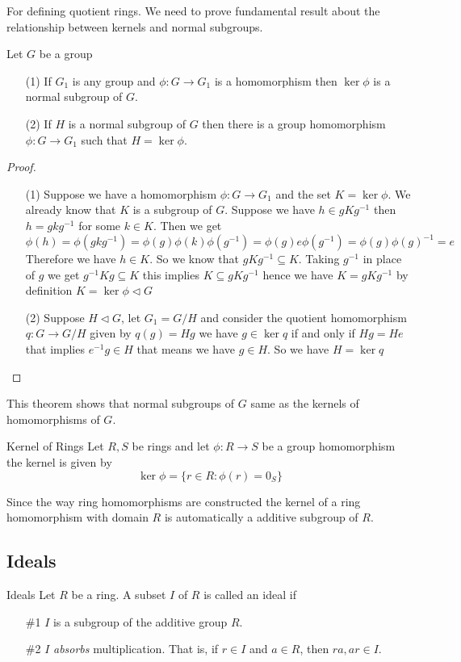 \documentclass[16pt,a4paper]{article}
\theoremstyle{definition}
\begin{document}
For defining quotient rings. We need to prove fundamental result about the relationship between kernels and normal subgroups. 
\begin{thm}{}{}
Let $G$ be a group
\begin{itemize}
\item[(1)] If $G_1$ is any group and $\phi: G\rightarrow G_1$ is a homomorphism then $\ker \phi$ is a normal subgroup of $G$. 
\item[(2)] If $H$ is a normal subgroup of $G$ then there is a group homomorphism $\phi: G\rightarrow G_1$ such that $H = \ker \phi$.  
\end{itemize}
\end{thm}
\begin{proof}
\begin{itemize}
\item[(1)] Suppose we have a homomorphism $\phi:G\rightarrow G_1$ and the set $K=\ker \phi$. We already know that $K$ is a subgroup of $G$. Suppose we have $h\in gKg^{-1}$ then $h = gkg^{-1}$ for some $k\in K$. Then we get
\[\phi(h) = \phi(gkg^{-1}) = \phi(g)\phi(k)\phi(g^{-1}) = \phi(g)e\phi(g^{-1}) = \phi(g)\phi(g)^{-1} = e\]
Therefore we have $h\in K$. So we know that $gKg^{-1}\subseteq K$. Taking $g^{-1}$ in place of $g$ we get $g^{-1}Kg \subseteq K$ this implies $K\subseteq gKg^{-1}$ hence we have $K = gKg^{-1}$ by definition $K=\ker \phi \lhd G$

\item[(2)] Suppose $H\lhd G$, let $G_1 = G/H$ and consider the quotient homomorphism $q:G\rightarrow G/H$ given by $q(g) = Hg$ we have $g\in \ker q$ if and only if $Hg = He$ that implies $e^{-1}g\in H$ that means we have $g\in H$. So we have $H=\ker q$
\end{itemize}
\end{proof}
This theorem shows that normal subgroups of $G$ same as the kernels of  homomorphisms of $G$.  

\newpage
\begin{defn}{Kernel of Rings}{}
Let $R,S$ be rings and let $\phi:R\rightarrow S$ be a group homomorphism the kernel is given by 
\[\ker \phi = \{r\in R : \phi(r) = 0_S\}\] 
\end{defn}
Since the way ring homomorphisms are constructed the kernel of a ring homomorphism with domain $R$ is automatically a additive subgroup of $R$.  

\subsection{Ideals}
\begin{defn}{Ideals}{}
Let $R$ be a ring. A subset $I$ of $R$ is called an ideal if 
\begin{itemize}
\item[\#1] $I$ is a subgroup of the additive group $R$. 
\item[\#2] $I$ \emph{absorbs} multiplication. That is, if $r\in I$ and $a\in R$, then $ra,ar\in I$. 
\end{itemize}
\end{defn}
\end{document}
